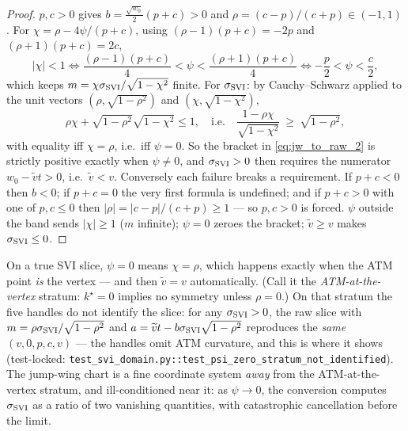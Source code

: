 \documentclass[11pt]{article}
\begin{document}
\begin{proof}
$p,c>0$ gives $b=\tfrac{\sqrt{w_0}}{2}(p+c)>0$ and
$\rho=(c-p)/(c+p)\in(-1,1)$. For $\chi=\rho-4\psi/(p+c)$, using
$(\rho-1)(p+c)=-2p$ and $(\rho+1)(p+c)=2c$,
\[
|\chi|<1
\iff \frac{(\rho-1)(p+c)}{4}<\psi<\frac{(\rho+1)(p+c)}{4}
\iff -\frac p2<\psi<\frac c2 ,
\]
which keeps $m=\chi\sigma_{\mathrm{SVI}}/\sqrt{1-\chi^2}$ finite. For $\sigma_{\mathrm{SVI}}$: by
Cauchy--Schwarz applied to the unit vectors $(\rho,\sqrt{1-\rho^2})$ and
$(\chi,\sqrt{1-\chi^2})$,
\[
\rho\chi+\sqrt{1-\rho^2}\sqrt{1-\chi^2}\le1,
\quad\text{i.e.}\quad
\frac{1-\rho\chi}{\sqrt{1-\chi^2}}\ \ge\ \sqrt{1-\rho^2},
\]
with equality iff $\chi=\rho$, i.e.\ iff $\psi=0$. So the bracket in
\eqref{eq:jw_to_raw_2} is strictly positive exactly when $\psi\neq0$, and
$\sigma_{\mathrm{SVI}}>0$ then requires the numerator $w_0-\widetilde vt>0$, i.e.\
$\widetilde v<v$. Conversely each failure breaks a requirement. If $p+c<0$
then $b<0$; if $p+c=0$ the very first formula is undefined; and if $p+c>0$
with one of $p,c\le0$ then $|\rho|=|c-p|/(c+p)\ge1$ --- so $p,c>0$ is forced.
$\psi$ outside the band sends $|\chi|\ge1$ ($m$ infinite); $\psi=0$ zeroes
the bracket; $\widetilde v\ge v$ makes $\sigma_{\mathrm{SVI}}\le0$.
\end{proof}

\begin{remark}[The $\psi=0$ stratum is a genuine coordinate singularity]
\label{rem:psi0}
On a true SVI slice, $\psi=0$ means $\chi=\rho$, which happens exactly when
the ATM point \emph{is} the vertex --- and then $\widetilde v=v$
automatically. (Call it the \emph{ATM-at-the-vertex} stratum: $k^\star=0$
implies no symmetry unless $\rho=0$.) On that stratum the five handles do not
identify the slice: for any $\sigma_{\mathrm{SVI}}>0$, the raw slice with
$m=\rho\sigma_{\mathrm{SVI}}/\sqrt{1-\rho^2}$ and $a=\widetilde vt-b\sigma_{\mathrm{SVI}}\sqrt{1-\rho^2}$
reproduces the \emph{same} $(v,0,p,c,v)$ --- the handles omit ATM curvature,
and this is where it shows (test-locked:
\texttt{test\_svi\_domain.py::test\_psi\_zero\_stratum\_not\_identified}).
The jump-wing chart is a fine coordinate system \emph{away} from the
ATM-at-the-vertex stratum, and ill-conditioned near it: as $\psi\to0$, the
conversion computes $\sigma_{\mathrm{SVI}}$ as a ratio of two vanishing quantities, with
catastrophic cancellation before the limit.
\end{remark}
\end{document}
